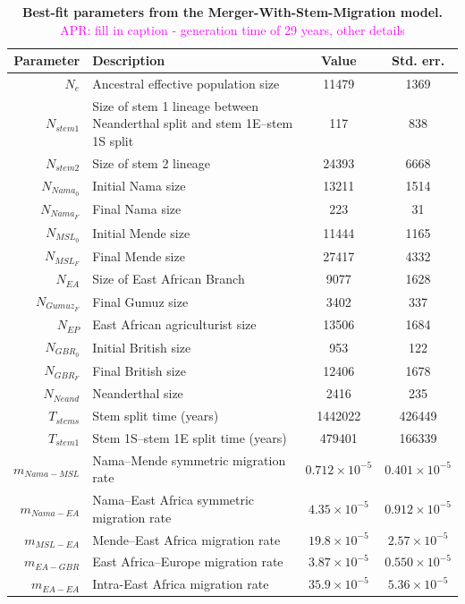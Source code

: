 \documentclass[]{article}
\newcommand{\aprcomment}[1]{{\textcolor{magenta}{APR: #1}}}
\begin{document}
\begin{table}[ht]
\caption{
    \label{tab:merger_with_stem_migration}
    \textbf{Best-fit parameters from the Merger-With-Stem-Migration model.}
    \aprcomment{fill in caption - generation time of 29 years, other details}
}
\centering
\begin{tabular}[t]{rP{8cm}cc}
    \toprule
    Parameter & Description & Value & Std. err.\\
    \midrule
    $N_e$ & Ancestral effective population size & 11479 & 1369 \\
    $N_{stem1}$ & Size of stem 1 lineage between Neanderthal split and stem 1E--stem 1S split & 117 & 838 \\
    $N_{stem2}$ & Size of stem 2 lineage & 24393 & 6668 \\
    $N_{Nama_0}$ & Initial Nama size & 13211 & 1514 \\
    $N_{Nama_F}$ & Final Nama size & 223 & 31 \\
    $N_{MSL_0}$ & Initial Mende size & 11444 & 1165 \\
    $N_{MSL_F}$ & Final Mende size & 27417 & 4332 \\
    $N_{EA}$ & Size of East African Branch & 9077 & 1628 \\
    $N_{Gumuz_F}$ & Final Gumuz size & 3402 & 337 \\
    $N_{EP}$ & East African agriculturist size & 13506 & 1684 \\
    $N_{GBR_0}$ & Initial British size & 953 & 122 \\
    $N_{GBR_F}$ & Final British size & 12406 & 1678 \\
    $N_{Neand}$ & Neanderthal size & 2416 & 235 \\
    $T_{stems}$ & Stem split time (years) & 1442022 & 426449 \\
    $T_{stem1}$ & Stem 1S--stem 1E split time (years) & 479401 & 166339 \\
    $m_{Nama-MSL}$ & Nama--Mende symmetric migration rate & $0.712\times10^{-5}$ & $0.401\times10^{-5}$ \\
    $m_{Nama-EA}$ & Nama--East Africa symmetric migration rate & $4.35\times10^{-5}$ & $0.912\times10^{-5}$ \\
    $m_{MSL-EA}$ & Mende--East Africa migration rate & $19.8\times10^{-5}$ & $2.57\times10^{-5}$ \\
    $m_{EA-GBR}$ & East Africa--Europe migration rate & $3.87\times10^{-5}$ & $0.550\times10^{-5}$ \\
    $m_{EA-EA}$ & Intra-East Africa migration rate & $35.9\times10^{-5}$ & $5.36\times10^{-5}$ \\

\end{tabular}
\end{table}
\end{document}
